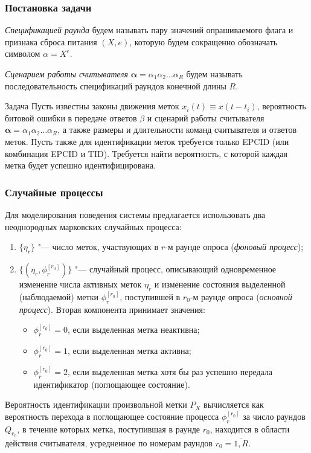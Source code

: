 \begin{frame}
    \frametitle{Постановка задачи}

    \begin{block}{}
    \textit{Спецификацией раунда} будем называть пару значений опрашиваемого флага и признака сброса питания $(X, e)$, которую будем сокращенно обозначать символом $\alpha = X^{e}$.
    \end{block}

    \begin{block}{}
    \textit{Сценарием работы считывателя} $\bm{\alpha} = \alpha_1 \alpha_2 \dots \alpha_R$ будем называть последовательность спецификаций раундов конечной длины $R$.
    \end{block}

    \begin{alertblock}{Задача}
        Пусть известны законы движения меток $x_i(t) \equiv x(t - t_i)$, вероятность битовой ошибки в передаче ответов $\beta$ и сценарий работы считывателя $\bm{\alpha} = \alpha_1 \alpha_2 \dots \alpha_R$, а также размеры и длительности команд считывателя и ответов меток. Пусть также для идентификации меток требуется только EPCID (или комбинация EPCID и TID). Требуется найти вероятность, с которой каждая метка будет успешно идентифицирована.
    \end{alertblock}
\end{frame}

\begin{frame}
    \frametitle{Случайные процессы}
    Для моделирования поведения системы предлагается использовать два неоднородных марковских случайных процесса:
    \small
    \begin{enumerate}
        \item $\{ \eta_r \}$ "--- число меток, участвующих в $r$-м раунде опроса (\textit{фоновый процесс});
        \item $\{( \eta_r, \phi_r^{[r_0]} )\}$ "--- случайный процесс, описывающий одновременное изменение числа активных меток $\eta_r$ и изменение состояния выделенной (наблюдаемой) метки $\phi_r^{[r_0]}$, поступившей в $r_0$-м раунде опроса (\textit{основной процесс}). Вторая компонента принимает значения:
        \footnotesize
        \begin{itemize}
            \item $\phi_r^{[r_0]} = 0$, если выделенная метка неактивна;
            \item $\phi_r^{[r_0]} = 1$, если выделенная метка активна;
            \item $\phi_r^{[r_0]} = 2$, если выделенная метка хотя бы раз успешно передала идентификатор (поглощающее состояние).
        \end{itemize}
    \end{enumerate}
    \begin{block}{}
        \small
        Вероятность идентификации произвольной метки $P_X$ вычисляется как вероятность перехода в поглощающее состояние процесса $\phi_r^{[r_0]}$ за число раундов $Q_{r_0}$, в течение которых метка, поступившая в раунде $r_0$, находится в области действия считывателя, усредненное по номерам раундов $r_0 = \overline{1, R}$.
    \end{block}
\end{frame}


